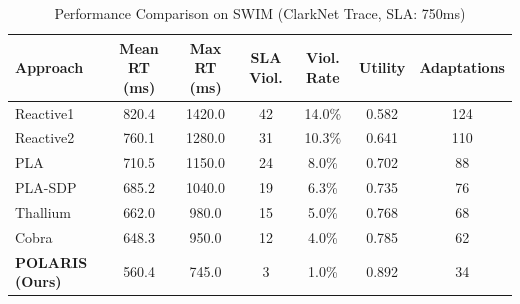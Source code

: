 \begin{table}[t]
\centering
\caption{Performance Comparison on SWIM (ClarkNet Trace, SLA: 750ms)}
\label{tab:swim_results}
\small
\begin{tabular}{lcccccc}
\toprule
\textbf{Approach} & \textbf{Mean RT (ms)} & \textbf{Max RT (ms)} & \textbf{SLA Viol.} & \textbf{Viol. Rate} & \textbf{Utility} & \textbf{Adaptations} \\
\midrule
Reactive1 & 820.4 & 1420.0 & 42 & 14.0\% & 0.582 & 124 \\
Reactive2 & 760.1 & 1280.0 & 31 & 10.3\% & 0.641 & 110 \\
PLA & 710.5 & 1150.0 & 24 & 8.0\% & 0.702 & 88 \\
PLA-SDP & 685.2 & 1040.0 & 19 & 6.3\% & 0.735 & 76 \\
Thallium & 662.0 & 980.0 & 15 & 5.0\% & 0.768 & 68 \\
Cobra & 648.3 & 950.0 & 12 & 4.0\% & 0.785 & 62 \\
\textbf{POLARIS (Ours)} & 560.4 & 745.0 & 3 & 1.0\% & 0.892 & 34 \\
\bottomrule
\end{tabular}
\end{table}
